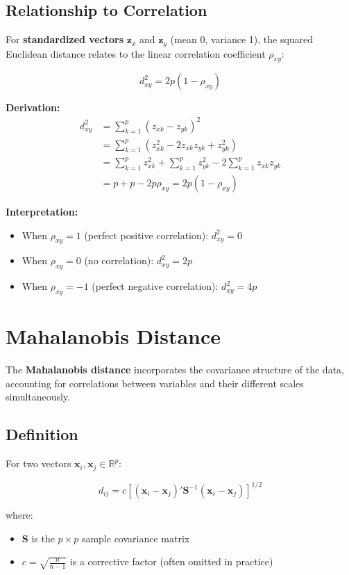\documentclass[11pt]{article}
\begin{document}
\subsection{Relationship to Correlation}

For \textbf{standardized vectors} $\mathbf{z}_x$ and $\mathbf{z}_y$ (mean 0, variance 1), the squared Euclidean distance relates to the linear correlation coefficient $\rho_{xy}$:

$$d_{xy}^2 = 2p(1 - \rho_{xy})$$

\textbf{Derivation:}
\begin{align*}
d_{xy}^2 &= \sum_{k=1}^{p} (z_{xk} - z_{yk})^2 \\
&= \sum_{k=1}^{p} (z_{xk}^2 - 2z_{xk}z_{yk} + z_{yk}^2) \\
&= \sum_{k=1}^{p} z_{xk}^2 + \sum_{k=1}^{p} z_{yk}^2 - 2\sum_{k=1}^{p} z_{xk}z_{yk} \\
&= p + p - 2p\rho_{xy} = 2p(1 - \rho_{xy})
\end{align*}

\textbf{Interpretation:} 
\begin{itemize}
    \item When $\rho_{xy} = 1$ (perfect positive correlation): $d_{xy}^2 = 0$
    \item When $\rho_{xy} = 0$ (no correlation): $d_{xy}^2 = 2p$
    \item When $\rho_{xy} = -1$ (perfect negative correlation): $d_{xy}^2 = 4p$
\end{itemize}

\section{Mahalanobis Distance}

The \textbf{Mahalanobis distance} incorporates the covariance structure of the data, accounting for correlations between variables and their different scales simultaneously.

\subsection{Definition}

For two vectors $\mathbf{x}_i, \mathbf{x}_j \in \mathbb{R}^p$:

$$d_{ij} = c\left[(\mathbf{x}_i - \mathbf{x}_j)' \mathbf{S}^{-1} (\mathbf{x}_i - \mathbf{x}_j)\right]^{1/2}$$

where:
\begin{itemize}
    \item $\mathbf{S}$ is the $p \times p$ sample covariance matrix
    \item $c = \sqrt{\frac{n}{n-1}}$ is a corrective factor (often omitted in practice)
\end{itemize}
\end{document}
